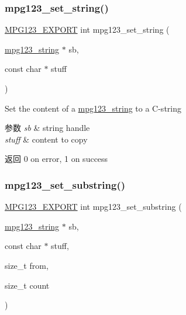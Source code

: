 \subsubsection{\texorpdfstring{mpg123\+\_\+set\+\_\+string()}{mpg123\_set\_string()}}
{\footnotesize\ttfamily \hyperlink{mpg123_8h_a2ba98cfba3f760879df70e755b2a61cc}{M\+P\+G123\+\_\+\+E\+X\+P\+O\+RT} int mpg123\+\_\+set\+\_\+string (\begin{DoxyParamCaption}\item[{\hyperlink{structmpg123__string}{mpg123\+\_\+string} $\ast$}]{sb,  }\item[{const char $\ast$}]{stuff }\end{DoxyParamCaption})}

Set the content of a \hyperlink{structmpg123__string}{mpg123\+\_\+string} to a C-\/string 
\begin{DoxyParams}{参数}
{\em sb} & string handle \\
\hline
{\em stuff} & content to copy \\
\hline
\end{DoxyParams}
\begin{DoxyReturn}{返回}
0 on error, 1 on success 
\end{DoxyReturn}
\mbox{\label{group__mpg123__metadata_ga37b68d834755647a4ef227b0dd4b5c2a}} 
\subsubsection{\texorpdfstring{mpg123\+\_\+set\+\_\+substring()}{mpg123\_set\_substring()}}
{\footnotesize\ttfamily \hyperlink{mpg123_8h_a2ba98cfba3f760879df70e755b2a61cc}{M\+P\+G123\+\_\+\+E\+X\+P\+O\+RT} int mpg123\+\_\+set\+\_\+substring (\begin{DoxyParamCaption}\item[{\hyperlink{structmpg123__string}{mpg123\+\_\+string} $\ast$}]{sb,  }\item[{const char $\ast$}]{stuff,  }\item[{size\+\_\+t}]{from,  }\item[{size\+\_\+t}]{count }\end{DoxyParamCaption})}

